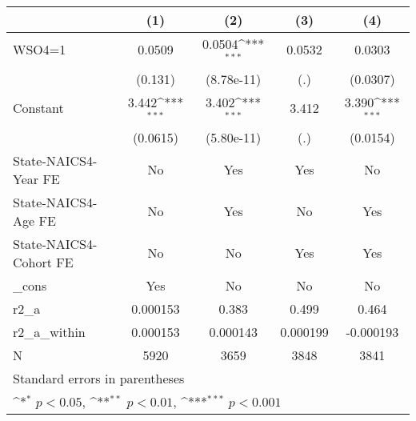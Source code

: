{
\def\sym#1{\ifmmode^{#1}\else\(^{#1}\)\fi}
\begin{tabular}{l*{4}{c}}
\hline\hline
                    &\multicolumn{1}{c}{(1)}         &\multicolumn{1}{c}{(2)}         &\multicolumn{1}{c}{(3)}         &\multicolumn{1}{c}{(4)}         \\
\hline
WSO4=1              &      0.0509         &      0.0504\sym{***}&      0.0532         &      0.0303         \\
                    &     (0.131)         &  (8.78e-11)         &         (.)         &    (0.0307)         \\
[1em]
Constant            &       3.442\sym{***}&       3.402\sym{***}&       3.412         &       3.390\sym{***}\\
                    &    (0.0615)         &  (5.80e-11)         &         (.)         &    (0.0154)         \\
[1em]
State-NAICS4-Year FE&          No         &         Yes         &         Yes         &          No         \\
[1em]
State-NAICS4-Age FE &          No         &         Yes         &          No         &         Yes         \\
[1em]
State-NAICS4-Cohort FE&          No         &          No         &         Yes         &         Yes         \\
[1em]
\_cons              &         Yes         &          No         &          No         &          No         \\
\hline
r2\_a                &    0.000153         &       0.383         &       0.499         &       0.464         \\
r2\_a\_within         &    0.000153         &    0.000143         &    0.000199         &   -0.000193         \\
N                   &        5920         &        3659         &        3848         &        3841         \\
\hline\hline
\multicolumn{5}{l}{\footnotesize Standard errors in parentheses}\\
\multicolumn{5}{l}{\footnotesize \sym{*} \(p<0.05\), \sym{**} \(p<0.01\), \sym{***} \(p<0.001\)}\\
\end{tabular}
}
